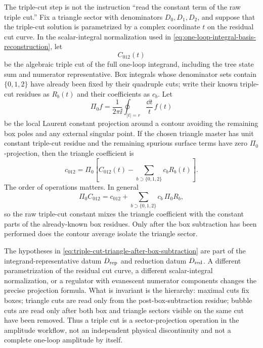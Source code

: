 \begin{controlledapproximation}
\label{ca:triple-cut-triangle-projection}
The triple-cut step is not the instruction ``read the constant term of the
raw triple cut.''  Fix a triangle sector with denominators
\(D_0,D_1,D_2\), and suppose that the triple-cut solution is parametrized by a
complex coordinate \(t\) on the residual cut curve.  In the scalar-integral
normalization used in \eqref{eq:one-loop-integral-basis-reconstruction}, let
\[
  C_{012}(t)
\]
be the algebraic triple cut of the full one-loop integrand, including the
tree state sum and numerator representative.  Box integrals whose denominator
sets contain \(\{0,1,2\}\) have already been fixed by their quadruple cuts;
write their known triple-cut residues as \(R_b(t)\) and their coefficients as
\(c_b\).  Let
\begin{equation}
  \Pi_0 f
  =
  \frac{1}{2\pi\ii}\oint_{|t|=r}\frac{\dd t}{t}\,f(t)
  \label{eq:triple-cut-constant-projection}
\end{equation}
be the local Laurent constant projection around a contour avoiding the
remaining box poles and any external singular point.  If the chosen triangle
master has unit constant triple-cut residue and the remaining spurious
surface terms have zero \(\Pi_0\)-projection, then the triangle coefficient is
\begin{equation}
  c_{012}
  =
  \Pi_0\!\left[
    C_{012}(t)-\sum_{b\supset\{0,1,2\}}c_bR_b(t)
  \right].
  \label{eq:triple-cut-triangle-after-box-subtraction}
\end{equation}
The order of operations matters.  In general
\[
  \Pi_0 C_{012}
  =
  c_{012}
  +
  \sum_{b\supset\{0,1,2\}}c_b\,\Pi_0 R_b ,
\]
so the raw triple-cut constant mixes the triangle coefficient with the
constant parts of the already-known box residues.  Only after the box
subtraction has been performed does the contour average isolate the triangle
sector.

The hypotheses in
\eqref{eq:triple-cut-triangle-after-box-subtraction} are part of the
integrand-representative datum \(D_{\rm rep}\) and reduction datum
\(D_{\rm red}\).  A different parametrization of the residual cut curve, a
different scalar-integral normalization, or a regulator with evanescent
numerator components changes the precise projection formula.  What is
invariant is the hierarchy: maximal cuts fix boxes; triangle cuts are read
only from the post-box-subtraction residue; bubble cuts are read only after
both box and triangle sectors visible on the same cut have been removed.
Thus a triple cut is a sector-projection operation in the amplitude workflow,
not an independent physical discontinuity and not a complete one-loop
amplitude by itself.
\end{controlledapproximation}

